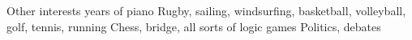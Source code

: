 \begin{rubric}{\color{Gray} Other interests}
 years of piano
\entry*[Sports] Rugby, sailing, windsurfing, basketball, volleyball,
golf, tennis, running
\entry*[Games] Chess, bridge, all sorts of logic games
\entry*[Social] Politics, debates
\end{rubric}
